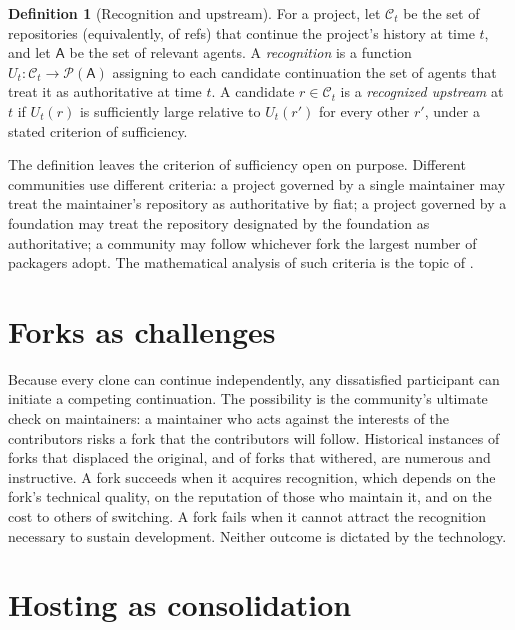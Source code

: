 \documentclass[11pt,twoside,openright]{book}
\theoremstyle{plain}
\theoremstyle{definition}
\newtheorem{definition}[theorem]{Definition}
\theoremstyle{remark}
\newcommand{\Pow}{\mathcal{P}}
\begin{document}
\begin{definition}[Recognition and upstream]\label{def:upstream}
For a project, let $\mathcal{C}_t$ be the set of repositories (equivalently, of refs) that continue the project's history at time $t$, and let $\mathsf{A}$ be the set of relevant agents. A \emph{recognition} is a function $U_t:\mathcal{C}_t\to\Pow(\mathsf{A})$ assigning to each candidate continuation the set of agents that treat it as authoritative at time $t$. A candidate $r\in\mathcal{C}_t$ is a \emph{recognized upstream} at $t$ if $U_t(r)$ is sufficiently large relative to $U_t(r')$ for every other $r'$, under a stated criterion of sufficiency.
\end{definition}

The definition leaves the criterion of sufficiency open on purpose. Different communities use different criteria: a project governed by a single maintainer may treat the maintainer's repository as authoritative by fiat; a project governed by a foundation may treat the repository designated by the foundation as authoritative; a community may follow whichever fork the largest number of packagers adopt. The mathematical analysis of such criteria is the topic of .

\section{Forks as challenges}

Because every clone can continue independently, any dissatisfied participant can initiate a competing continuation. The possibility is the community's ultimate check on maintainers: a maintainer who acts against the interests of the contributors risks a fork that the contributors will follow. Historical instances of forks that displaced the original, and of forks that withered, are numerous and instructive. A fork succeeds when it acquires recognition, which depends on the fork's technical quality, on the reputation of those who maintain it, and on the cost to others of switching. A fork fails when it cannot attract the recognition necessary to sustain development. Neither outcome is dictated by the technology.

\section{Hosting as consolidation}
\end{document}
